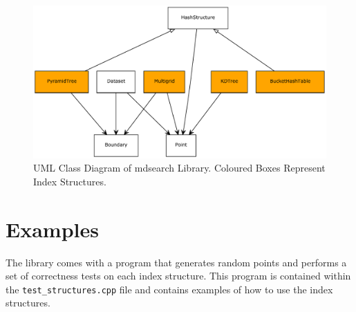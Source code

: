 \begin{figure}[H]
	\centering
	\includegraphics[scale=0.6]{figures/mdsearch_classes_uml.pdf}
	\caption{UML Class Diagram of mdsearch Library. Coloured Boxes Represent Index Structures.}
	\label{fig:library-class-diagram} 
\end{figure}

\section{Examples}

The library comes with a program that generates random points and performs a set of correctness tests on each index structure. This program is contained within the \texttt{test\_structures.cpp} file and contains examples of how to use the index structures.